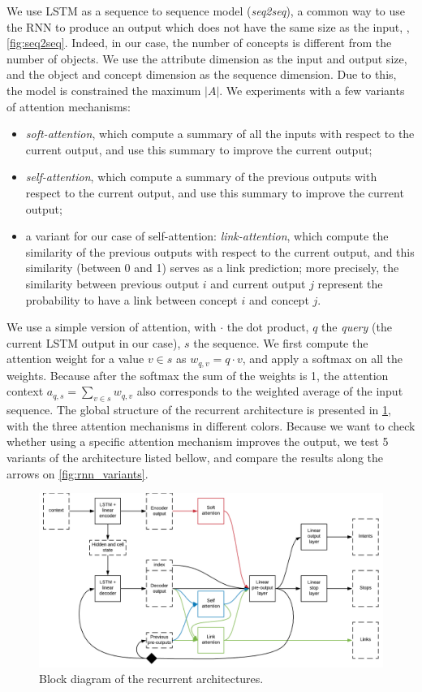 We use LSTM as a sequence to sequence model (\textit{seq2seq}), a common way to use the RNN to produce an output which does not have the same size as the input, \eg, \cref{fig:seq2seq}. Indeed, in our case, the number of concepts is different from the number of objects.
We use the attribute dimension as the input and output size, and the object and concept dimension as the sequence dimension. Due to this, the model is constrained the maximum $|A|$.
We experiments with a few variants of attention mechanisms:
\begin{itemize}
    \item \textit{soft-attention}, which compute a summary of all the inputs with respect to the current output, and use this summary to improve the current output;
    \item \textit{self-attention}, which compute a summary of the previous outputs with respect to the current output, and use this summary to improve the current output;
    \item a variant for our case of self-attention: \textit{link-attention}, which compute the similarity of the previous outputs with respect to the current output, and this similarity (between 0 and 1) serves as a link prediction; more precisely, the similarity between previous output $i$ and current output $j$ represent the probability to have a link between concept $i$ and concept $j$.
\end{itemize}
We use a simple version of attention, with $\cdot$ the dot product, $q$ the \textit{query} (the current LSTM output in our case), $s$ the sequence. We first compute the attention weight for a value $v\in s$ as $w_{q, v} = q \cdot v$, and apply a softmax on all the weights. Because after the softmax the sum of the weights is 1, the attention context $a_{q,s} = \sum_{v\in s}{w_{q, v}}$ also corresponds to the weighted average of the input sequence.
The global structure of the recurrent architecture is presented in \cref{fig:lstm_block}, with the three attention mechanisms in different colors.
Because we want to check whether using a specific attention mechanism improves the output, we test 5 variants of the architecture listed bellow, and compare the results along the arrows on \cref{fig:rnn_variants}.

\begin{figure}
    \centering
    \includegraphics[width = .8\textwidth, height = .4\textwidth, keepaspectratio]{Figures/Ch3/lstm_block.png}
    \caption{Block diagram of the recurrent architectures.}
    \label{fig:lstm_block}
\end{figure}

